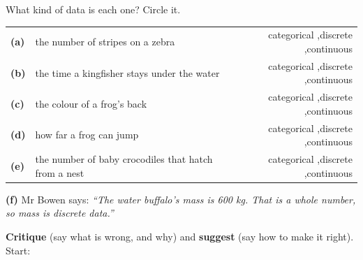 \documentclass[12pt,a4paper]{article}
\newcommand{\qlines}[1]{\par\nobreak
  \noindent\begin{minipage}{\linewidth}\wlines{#1}\end{minipage}\par}
\begin{document}
\clearpage
{}

\noindent\begin{minipage}{\textwidth}
\noindent What kind of data is each one? Circle it.

\vspace{4pt}
{\renewcommand{\arraystretch}{1.5}%
\noindent\begin{tabularx}{\textwidth}{@{}l@{\ \ }L@{\ \ }r@{}}
  \textbf{(a)} & the number of stripes on a zebra &
    categorical \sep discrete \sep continuous \\
  \textbf{(b)} & the time a kingfisher stays under the water &
    categorical \sep discrete \sep continuous \\
  \textbf{(c)} & the colour of a frog's back &
    categorical \sep discrete \sep continuous \\
  \textbf{(d)} & how far a frog can jump &
    categorical \sep discrete \sep continuous \\
  \textbf{(e)} & the number of baby crocodiles that hatch from a nest &
    categorical \sep discrete \sep continuous \\
\end{tabularx}}
\end{minipage}

\vspace{8pt}
\noindent\begin{minipage}{\textwidth}
\noindent\textbf{(f)} Mr Bowen says: \emph{``The water buffalo's mass is 600 kg. That is a
whole number, so mass is discrete data.''}

\textbf{Critique} (say what is wrong, and why) and \textbf{suggest} (say how to make it
right). \\[3pt]
Start: 
\qlines{4}
\end{minipage}

\vfill
{}
\end{document}
